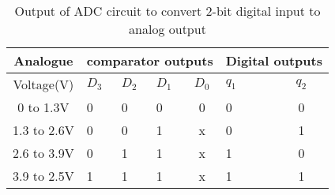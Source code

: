\begin{table}[H]
    \centering
    \begin{tabular}{|c|c|c|c|c|c|c|}
        \hline
        Analogue    & \multicolumn{4}{c|}{comparator outputs} & \multicolumn{2}{c|}{Digital outputs}                                                                   \\ \hline
        Voltage(V)  & \multicolumn{1}{l|}{$D_3$}                & \multicolumn{1}{l|}{$D_2$}             & \multicolumn{1}{l|}{$D_1$} & $D_0$ & \multicolumn{1}{l|}{$q_1$} & $q_2$ \\ \hline
        0 to 1.3V   & \multicolumn{1}{l|}{0}                  & \multicolumn{1}{l|}{0}               & \multicolumn{1}{l|}{0}   & 0   & \multicolumn{1}{l|}{0}   & 0   \\ \hline
        1.3 to 2.6V & \multicolumn{1}{l|}{0}                  & \multicolumn{1}{l|}{0}               & \multicolumn{1}{l|}{1}   & x   & \multicolumn{1}{l|}{0}   & 1   \\ \hline
        2.6 to 3.9V & \multicolumn{1}{l|}{0}                  & \multicolumn{1}{l|}{1}               & \multicolumn{1}{l|}{1}   & x   & \multicolumn{1}{l|}{1}   & 0   \\ \hline
        3.9 to 2.5V & \multicolumn{1}{l|}{1}                  & \multicolumn{1}{l|}{1}               & \multicolumn{1}{l|}{1}   & x   & \multicolumn{1}{l|}{1}   & 1   \\ \hline
    \end{tabular}
    \caption{ Output of ADC circuit to convert 2-bit digital input to analog output}
    \label{tab:4}
\end{table}